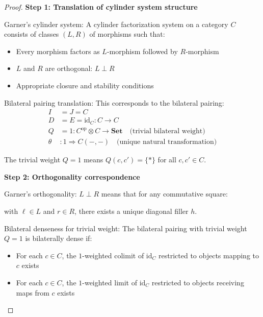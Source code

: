 \documentclass[11pt]{article}
\theoremstyle{plain}
\theoremstyle{definition}
\theoremstyle{remark}
\newcommand{\op}{\mathrm{op}}
\begin{document}
\begin{proof}
\textbf{Step 1: Translation of cylinder system structure}

Garner's cylinder system: A cylinder factorization system on a category $C$ consists of classes $(L, R)$ of morphisms such that:
\begin{itemize}
\item Every morphism factors as $L$-morphism followed by $R$-morphism
\item $L$ and $R$ are orthogonal: $L \perp R$
\item Appropriate closure and stability conditions
\end{itemize}

Bilateral pairing translation: This corresponds to the bilateral pairing:
\begin{align}
I &= J = C \\
D &= E = \text{id}_C : C \to C \\
Q &= 1 : C^{\op} \otimes C \to \mathbf{Set} \quad \text{(trivial bilateral weight)} \\
\theta &: 1 \Rightarrow C(-, -) \quad \text{(unique natural transformation)}
\end{align}

The trivial weight $Q = 1$ means $Q(c, c') = \{*\}$ for all $c, c' \in C$.

\textbf{Step 2: Orthogonality correspondence}

Garner's orthogonality: $L \perp R$ means that for any commutative square:
\begin{center}
\end{center}
with $\ell \in L$ and $r \in R$, there exists a unique diagonal filler $h$.

Bilateral denseness for trivial weight: The bilateral pairing with trivial weight $Q = 1$ is bilaterally dense if:
\begin{itemize}
\item For each $c \in C$, the $1$-weighted colimit of $\text{id}_C$ restricted to objects mapping to $c$ exists
\item For each $c \in C$, the $1$-weighted limit of $\text{id}_C$ restricted to objects receiving maps from $c$ exists
\end{itemize}


\end{proof}
\end{document}
